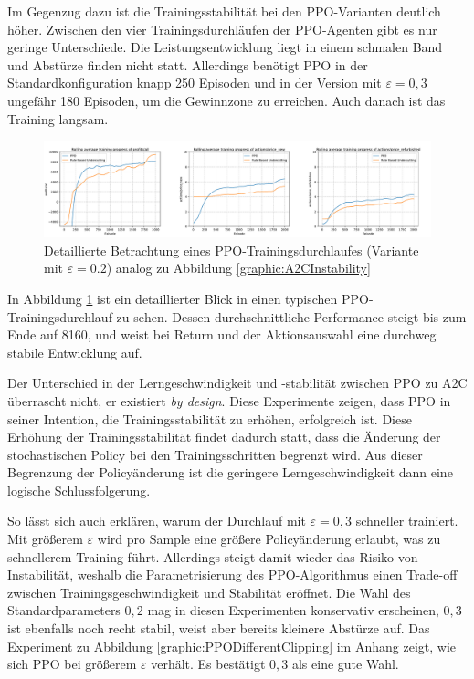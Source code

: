 Im Gegenzug dazu ist die Trainingsstabilität bei den PPO-Varianten deutlich höher.
Zwischen den vier Trainingsdurchläufen der PPO-Agenten gibt es nur geringe Unterschiede.
Die Leistungsentwicklung liegt in einem schmalen Band und Abstürze finden nicht statt.
Allerdings benötigt PPO in der Standardkonfiguration knapp 250 Episoden und in der Version mit $\varepsilon=0,3$ ungefähr 180 Episoden, um die Gewinnzone zu erreichen.
Auch danach ist das Training langsam.
\begin{figure}[htb]
	\centering
	\includegraphics[width=\textwidth]{main/ppo_detailed_analysis.pdf}
	\caption{Detaillierte Betrachtung eines PPO-Trainingsdurchlaufes (Variante mit $\varepsilon=0.2$) analog zu Abbildung \ref{graphic:A2CInstability}}
	\label{graphic:PPOStability}
\end{figure}
In Abbildung \ref{graphic:PPOStability} ist ein detaillierter Blick in einen typischen PPO-Trainingsdurchlauf zu sehen.
Dessen durchschnittliche Performance steigt bis zum Ende auf 8160, und weist bei Return und der Aktionsauswahl eine durchweg stabile Entwicklung auf.

Der Unterschied in der Lerngeschwindigkeit und -stabilität zwischen PPO zu A2C überrascht nicht, er existiert \textit{by design}.
Diese Experimente zeigen, dass PPO in seiner Intention, die Trainingsstabilität zu erhöhen, erfolgreich ist.
Diese Erhöhung der Trainingsstabilität findet dadurch statt, dass die Änderung der stochastischen Policy bei den Trainingsschritten begrenzt wird.
Aus dieser Begrenzung der Policyänderung ist die geringere Lerngeschwindigkeit dann eine logische Schlussfolgerung.

So lässt sich auch erklären, warum der Durchlauf mit $\varepsilon=0,3$ schneller trainiert.
Mit größerem $\varepsilon$ wird pro Sample eine größere Policyänderung erlaubt, was zu schnellerem Training führt.
Allerdings steigt damit wieder das Risiko von Instabilität, weshalb die Parametrisierung des PPO-Algorithmus einen Trade-off zwischen Trainingsgeschwindigkeit und Stabilität eröffnet.
Die Wahl des Standardparameters $0,2$ mag in diesen Experimenten konservativ erscheinen, $0,3$ ist ebenfalls noch recht stabil, weist aber bereits kleinere Abstürze auf.
Das Experiment zu Abbildung \ref{graphic:PPODifferentClipping} im Anhang zeigt, wie sich PPO bei größerem $\varepsilon$ verhält.
Es bestätigt $0,3$ als eine gute Wahl.

